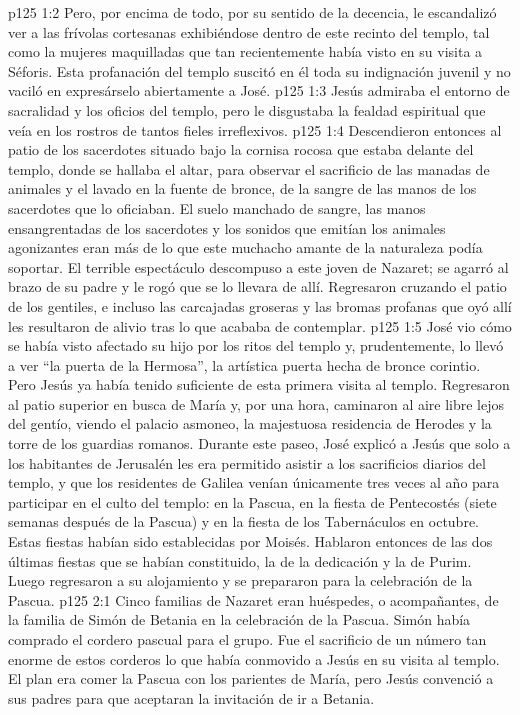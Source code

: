 \vs p125 1:2 Pero, por encima de todo, por su sentido de la decencia, le escandalizó ver a las frívolas cortesanas exhibiéndose dentro de este recinto del templo, tal como la mujeres maquilladas que tan recientemente había visto en su visita a Séforis. Esta profanación del templo suscitó en él toda su indignación juvenil y no vaciló en expresárselo abiertamente a José.
\vs p125 1:3 Jesús admiraba el entorno de sacralidad y los oficios del templo, pero le disgustaba la fealdad espiritual que veía en los rostros de tantos fieles irreflexivos.
\vs p125 1:4 Descendieron entonces al patio de los sacerdotes situado bajo la cornisa rocosa que estaba delante del templo, donde se hallaba el altar, para observar el sacrificio de las manadas de animales y el lavado en la fuente de bronce, de la sangre de las manos de los sacerdotes que lo oficiaban. El suelo manchado de sangre, las manos ensangrentadas de los sacerdotes y los sonidos que emitían los animales agonizantes eran más de lo que este muchacho amante de la naturaleza podía soportar. El terrible espectáculo descompuso a este joven de Nazaret; se agarró al brazo de su padre y le rogó que se lo llevara de allí. Regresaron cruzando el patio de los gentiles, e incluso las carcajadas groseras y las bromas profanas que oyó allí les resultaron de alivio tras lo que acababa de contemplar.
\vs p125 1:5 José vio cómo se había visto afectado su hijo por los ritos del templo y, prudentemente, lo llevó a ver “la puerta de la Hermosa”, la artística puerta hecha de bronce corintio. Pero Jesús ya había tenido suficiente de esta primera visita al templo. Regresaron al patio superior en busca de María y, por una hora, caminaron al aire libre lejos del gentío, viendo el palacio asmoneo, la majestuosa residencia de Herodes y la torre de los guardias romanos. Durante este paseo, José explicó a Jesús que solo a los habitantes de Jerusalén les era permitido asistir a los sacrificios diarios del templo, y que los residentes de Galilea venían únicamente tres veces al año para participar en el culto del templo: en la Pascua, en la fiesta de Pentecostés (siete semanas después de la Pascua) y en la fiesta de los Tabernáculos en octubre. Estas fiestas habían sido establecidas por Moisés. Hablaron entonces de las dos últimas fiestas que se habían constituido, la de la dedicación y la de Purim. Luego regresaron a su alojamiento y se prepararon para la celebración de la Pascua.
\vs p125 2:1 Cinco familias de Nazaret eran huéspedes, o acompañantes, de la familia de Simón de Betania en la celebración de la Pascua. Simón había comprado el cordero pascual para el grupo. Fue el sacrificio de un número tan enorme de estos corderos lo que había conmovido a Jesús en su visita al templo. El plan era comer la Pascua con los parientes de María, pero Jesús convenció a sus padres para que aceptaran la invitación de ir a Betania.
